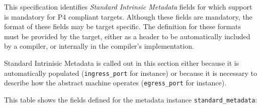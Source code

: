 \documentclass[12pt]{article}
\begin{document}
This specification identifies \textit{Standard Intrinsic Metadata} fields for which 
support is man\-datory for P4 compliant targets. Although these fields are mandatory, 
the format of these fields may be target specific. The definition for these 
formats must be provided by the target, either as a header to be automatically 
included by a compiler, or internally in the compiler's implementation.

Standard Intrinisic Metadata is called out in this section either because 
it is automatically populated (\texttt{ingress_port} for instance) or because it 
is necessary to describe how the abstract machine operates (\texttt{egress_port} for 
instance).

This table shows the fields defined for the metadata instance \texttt{standard_metadata}:
\end{document}
